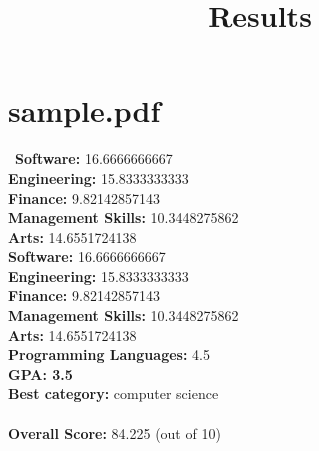 \documentclass{article}
\title{Results}
\begin{document}
\section{sample.pdf}\
\textbf{Software:} 16.6666666667\\
\textbf{Engineering:} 15.8333333333\\
\textbf{Finance:} 9.82142857143\\
\textbf{Management Skills:} 10.3448275862\\
\textbf{Arts:} 14.6551724138\\
\textbf{Software:} 16.6666666667\\
\textbf{Engineering:} 15.8333333333\\
\textbf{Finance:} 9.82142857143\\
\textbf{Management Skills:} 10.3448275862\\
\textbf{Arts:} 14.6551724138\\
\textbf{Programming Languages:} 4.5\\
\textbf{GPA: 3.5}\\
\textbf{Best category: } computer science\\
\\\textbf{Overall Score: }84.225 (out of 10)
\end{document}
